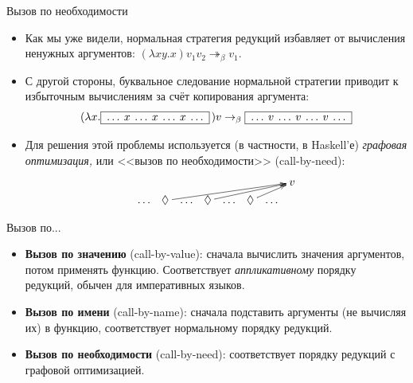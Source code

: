 \documentclass[xcolor=dvipsnames]{beamer}
\begin{document}
\begin{frame}{Вызов по необходимости}

\begin{itemize}[<+->]
 \item Как мы уже видели, нормальная стратегия редукций избавляет от вычисления ненужных аргументов: $(\lambda x y . x) v_1 v_2 \twoheadrightarrow_\beta v_1$.
 \item С другой стороны, буквальное следование нормальной стратегии приводит к избыточным вычислениям за счёт копирования аргумента:
 \[
  (\lambda x. \mbox{\fbox{$\:\ldots\: x \:\ldots\: x \:\ldots\: x \:\ldots\:$}}\,) v \to_\beta
\mbox{\fbox{$\:\ldots\: v \:\ldots\: v \:\ldots\: v \:\ldots\:$}}
 \]
\item Для решения этой проблемы используется (в частности, в Haskell'е) {\em графовая оптимизация,} или <<вызов по необходимости>> (call-by-need):
\[
\xymatrix@-2em{
&&&&&&& v \\
\ldots & \lozenge\ar[urrrrrr] & \ldots & \lozenge
\ar[urrrr] & \ldots & \lozenge\ar[urr] & \ldots
}
\]
\end{itemize}

 
\end{frame}

\begin{frame}{Вызов по...}

\begin{itemize}
 \item {\bf Вызов по значению} (call-by-value): сначала вычислить значения аргументов, потом применять функцию. Соответствует {\em аппликативному} порядку редукций, обычен для императивных языков.
 
 \item {\bf Вызов по имени} (call-by-name): сначала подставить аргументы (не вычисляя их) в функцию, соответствует нормальному порядку редукций.
 
 \item {\bf Вызов по необходимости} (call-by-need): соответствует порядку редукций с графовой оптимизацией.
\end{itemize}

 
\end{frame}
\end{document}
